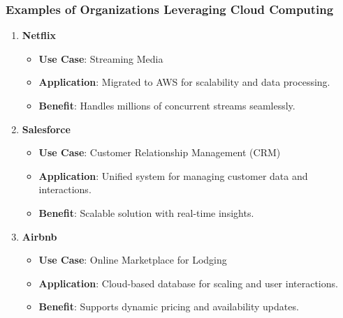 \documentclass[aspectratio=169]{beamer}
\begin{document}
\begin{frame}[fragile]
    \frametitle{Examples of Organizations Leveraging Cloud Computing}
    \begin{enumerate}
        \item \textbf{Netflix}
        \begin{itemize}
            \item \textbf{Use Case}: Streaming Media
            \item \textbf{Application}: Migrated to AWS for scalability and data processing.
            \item \textbf{Benefit}: Handles millions of concurrent streams seamlessly.
        \end{itemize}
        
        \item \textbf{Salesforce}
        \begin{itemize}
            \item \textbf{Use Case}: Customer Relationship Management (CRM)
            \item \textbf{Application}: Unified system for managing customer data and interactions.
            \item \textbf{Benefit}: Scalable solution with real-time insights.
        \end{itemize}
        
        \item \textbf{Airbnb}
        \begin{itemize}
            \item \textbf{Use Case}: Online Marketplace for Lodging
            \item \textbf{Application}: Cloud-based database for scaling and user interactions.
            \item \textbf{Benefit}: Supports dynamic pricing and availability updates.
        \end{itemize}
    \end{enumerate}
\end{frame}
\end{document}
